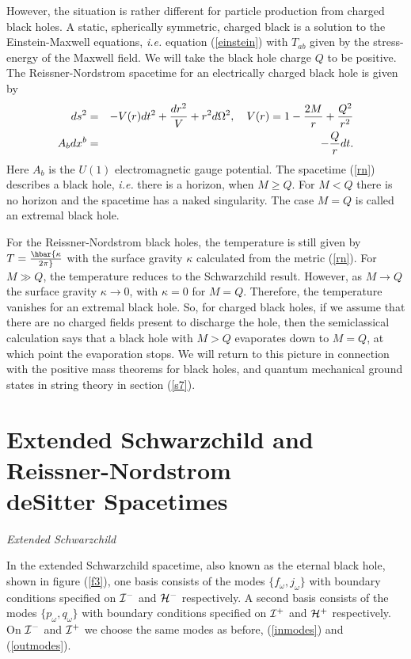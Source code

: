 \documentclass[12pt]{article}
\newcommand{\p}{\partial}
\def\bena{\begin{eqnarray}}
\def\eena{\end{eqnarray}}
\def\fh{{\cal H}^+}
\def\ph{{\cal H}^-}
\def\finf{{\cal I}^+}
\def\pinf{{\cal I}^-}
\def\f{f_{\omega}}
\def\p{p_{\omega}}
\def\q{q_{\omega}}
\def\j{j_{\omega}}
\begin{document}
However, the situation is rather different for particle production
from charged black holes. A static, spherically symmetric, charged black is a
solution to the Einstein-Maxwell equations, {\it i.e.} equation
(\ref{einstein}) with $T_{ab}$ given by the
stress-energy of the Maxwell field.
We will take the black hole
charge $Q$ to be positive.  The Reissner-Nordstrom spacetime for an
electrically charged
black hole is given by
%
\bena\label{rn} ds^2  &= &-V(r)dt^2 +{dr^2 \over V} +r^2 d\Omega ^2,
\quad V(r) = 1-{2M\over r} +{Q^2 \over r^2}  \\
A_b dx^b &=&-{Q\over r}dt .\eena
%
Here $A_b$ is the $U(1)$ electromagnetic gauge potential. The spacetime
(\ref{rn})  describes
a black hole, {\it i.e.} there is a horizon, when $M\ge Q$.  For $M<Q$
there is no
horizon and the spacetime has a naked singularity. The case $M=Q$
is called an extremal black hole.

For the Reissner-Nordstrom black holes, the temperature is still given by
$T=\hbar
{\kappa\over 2\pi}$ with the surface gravity $\kappa$ calculated from the
metric (\ref{rn}).
For $M\gg Q$, the
temperature reduces to the Schwarzchild result.  However, as $M\rightarrow
Q $ the surface
gravity  $\kappa\rightarrow 0$, with $\kappa =0$ for $M=Q$.
Therefore, the temperature vanishes for an extremal black hole. So, for
charged black holes, if we assume that
there are no charged fields present to discharge the hole, then the
semiclassical calculation says
that a black hole with $M>Q$ evaporates down to $M=Q$, at which point the
evaporation stops.
We will return to this picture in connection with the positive mass
theorems for black
holes, and quantum mechanical ground states in  string theory in section (\ref{s7}).

\section{Extended Schwarzchild and Reissner-Nordstrom\\ deSitter Spacetimes}
\label{section6}

\vskip 0.1in\noindent
{\it Extended Schwarzchild}
\vskip 0.05in

In the extended Schwarzchild spacetime, also known as the eternal black hole,
shown in figure (\ref{f3}), one basis
consists of the modes $\{\f,\j\}$ with boundary conditions specified on
$\pinf$ and $\ph$ respectively.  A
second basis consists of the modes $\{ \p ,\q \}$ with boundary conditions
specified on
$\finf$ and $\fh$ respectively.  On $\pinf$ and $\finf$ we choose the
same modes as before, (\ref{inmodes}) and (\ref{outmodes}).
\end{document}

